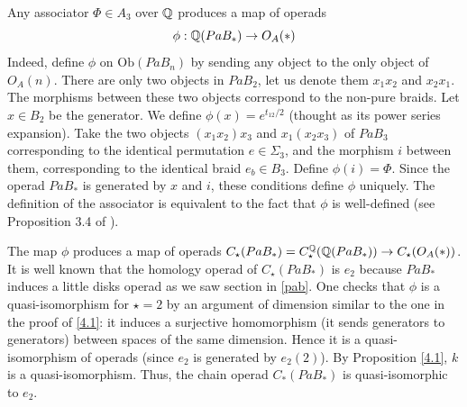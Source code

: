 \documentclass[TFM.tex]{subfiles}
\begin{document}
Any associator $\Phi\in A_3$ over $\mathbb{Q}$ produces a map of operads
\[
\phi:\mathbb{Q}(PaB_*)\to O_A(*)
\]
Indeed, define $\phi$ on $\mathrm{Ob}(PaB_n)$ by sending any object to the only object of $O_A(n)$.
There are only two objects in $PaB_2$, let us denote them $x_1x_2$ and $x_2x_1$. The morphisms
between these two objects correspond to the non-pure braids. Let $x\in B_2$
be the generator. We define $\phi(x)=e^{t_{12}/2}$ (thought as its power series expansion). Take the two objects $(x_1x_2)x_3$ and
$x_1(x_2x_3)$ of $PaB_3$ corresponding to the identical permutation $e \in \Sigma_3$, and the morphism
$i$ between them, corresponding to the identical braid $e_b\in B_3$. Define $\phi(i)=\Phi$.
Since the operad $PaB_*$ is generated by $x$ and $i$, these conditions define $\phi$ uniquely. %
The definition of the associator is equivalent to the fact that $\phi$ is well-defined (see Proposition 3.4 of \cite{1deTamarkin}).

The map $\phi$ produces a map of operads $C_\star(PaB_*)=C_\star^{\mathbb{Q}}(\mathbb{Q}(PaB_*))\to C_\star(O_A(*))$.
It is well known that the homology operad of $C_\star(PaB_*)$ is $e_2$ because $PaB_*$ induces a little disks operad as we saw section in \ref{pab}. One checks that $\phi$ is a quasi-isomorphism for $\star=2$ by an argument of dimension similar to the one in the proof of \ref{4.1}: it induces a surjective homomorphism (it sends generators to generators) between spaces of the same dimension. Hence it is a quasi-isomorphism of operads (since
$e_2$ is generated by $e_2(2)$). By Proposition \ref{4.1}, $k$ is a quasi-isomorphism. Thus, the
chain operad $C_*(PaB_*)$ is quasi-isomorphic to $e_2$.



\end{document}
